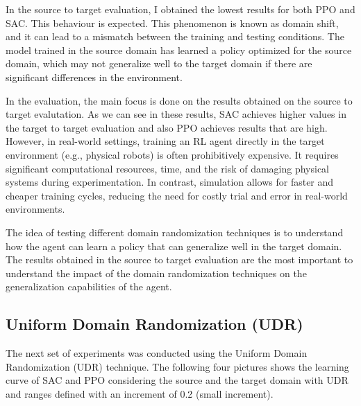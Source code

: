 \documentclass[11pt]{article}
\begin{document}
In the source to target evaluation, I obtained the lowest results for both PPO and SAC. This behaviour is expected. This phenomenon is known as domain shift, and it can lead to a mismatch between the training and testing conditions. The model trained in the source domain has learned a policy optimized for the source domain, which may not generalize well to the target domain if there are significant differences in the environment. 

In the evaluation, the main focus is done on the results obtained on the source to target evalutation. As we can see in these results, SAC achieves higher values in the target to target evaluation and also PPO achieves results that are high. However, in real-world settings, training an RL agent directly in the target environment (e.g., physical robots) is often prohibitively expensive. It requires significant computational resources, time, and the risk of damaging physical systems during experimentation. In contrast, simulation allows for faster and cheaper training cycles, reducing the need for costly trial and error in real-world environments. 

The idea of testing different domain randomization techniques is to understand how the agent can learn a policy that can generalize well in the target domain. The results obtained in the source to target evaluation are the most important to understand the impact of the domain randomization techniques on the generalization capabilities of the agent.

\subsection{Uniform Domain Randomization (UDR)}

The next set of experiments was conducted using the Uniform Domain Randomization (UDR) technique. The following four pictures shows the learning curve of SAC and PPO considering the source and the target domain with UDR and ranges defined with an increment of 0.2 (small increment).
\end{document}
